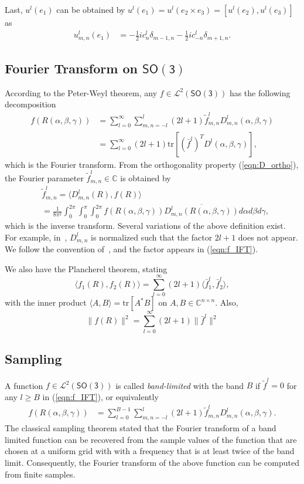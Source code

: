 \documentclass[onecolumn,11pt]{IEEEtran}
\newcommand{\pair}[1]{\ensuremath{\langle #1 \rangle}}
\newcommand{\refeqn}[1]{(\ref{eqn:#1})}
\newcommand{\trs}[1]{\mathrm{tr}\ensuremath{[#1]}}
\newcommand{\SO}{\ensuremath{\mathsf{SO(3)}}}
\newcommand{\Cp}{\ensuremath{\mathbb{C}}}
\begin{document}
Last, $u^l(e_1)$ can be obtained by $u^l(e_1)=u^l(e_2\times e_3)=[u^l(e_2), u^l(e_3)]$ as
\begin{align}
u^l_{m,n}(e_1) 
& = -\frac{1}{2}i c^l_n \delta_{m-1,n}-\frac{1}{2}i c^l_{-n} \delta_{m+1,n}.
\end{align}

\subsection{Fourier Transform on $\SO$}

According to the Peter-Weyl theorem, any $f\in\mathcal{L}^2(\SO)$ has the following decomposition
\begin{align}
f(R(\alpha,\beta,\gamma)) &= \sum_{l=0}^\infty \sum_{m,n=-l}^l (2l+1)\tilde f^l_{m,n} D^l_{m,n}(\alpha,\beta,\gamma)\nonumber\\
&= \sum_{l=0}^\infty (2l+1)\trs{(\bar f^l)^T D^l(\alpha,\beta,\gamma)},\label{eqn:f_IFT}
\end{align}
which is the Fourier transform. 
From the orthogonality property \refeqn{D_ortho}, the Fourier parameter $\tilde f^l_{m,n}\in\Cp$ is obtained by
\begin{align}
& \tilde f^l_{m,n}=\pair{ D^l_{m,n}(R), f(R)}\nonumber\\
& =\frac{1}{8\pi^2}\int_0^{2\pi}\int_{0}^\pi\int_0^{2\pi} f(R(\alpha,\beta,\gamma)) \overline{D^{l}_{m,n}(R(\alpha,\beta,\gamma))}d\alpha d\beta d\gamma,\label{eqn:f_FT}
\end{align}
which is the inverse transform. 
Several variations of the above definition exist. 
For example, in~\cite{KosRocJFAA08}, $D^l_{m,n}$ is normalized such that the factor $2l+1$ does not appear. 
We follow the convention of~\cite{ChiKya01}, and the factor appears in \refeqn{f_IFT}.

We also have the Plancherel theorem, stating
\[
\pair{f_1(R), f_2(R)} = \sum_{l=0}^\infty (2l+1)\pair{\bar f_1^l, \bar f_2^l},
\]
with the inner product $\pair{A,B}=\trs{A^*B}$ on $A,B\in\Cp^{n\times n}$. Also, 
\[
\| f(R)\|^2 = \sum_{l=0}^\infty (2l+1)\|\bar f^l\|^2
\]


\subsection{Sampling}

A function $f\in\mathcal{L}^2(\SO)$ is called \textit{band-limited} with the band $B$ if $\tilde f^l=0$ for any $l\geq B$ in \refeqn{f_IFT}, or equivalently
\begin{align}
f(R(\alpha,\beta,\gamma)) &= \sum_{l=0}^{B-1} \sum_{m,n=-l}^l (2l+1)\tilde f^l_{m,n} D^l_{m,n}(\alpha,\beta,\gamma).\label{eqn:fB}
\end{align}
The classical sampling theorem stated that the Fourier transform of a band limited function can be recovered from the sample values of the function that are chosen at a uniform grid with with a frequency that is at least twice of the band limit. 
Consequently, the Fourier transform of the above function can be computed from finite samples. 
\end{document}

